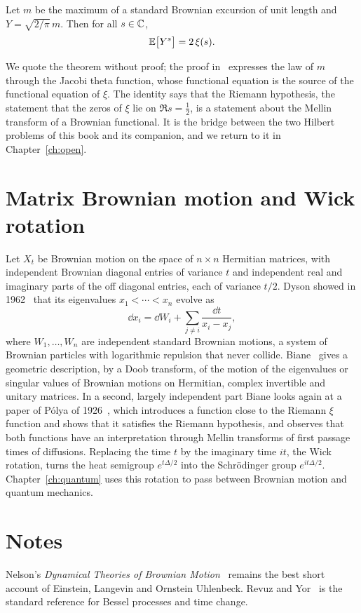 \begin{theorem}
\label{thm:bpy}
Let $m$ be the maximum of a standard Brownian excursion of unit length and $Y = \sqrt{2/\pi}\,m$. Then for all $s\in\mathbb{C}$,
\[
\mathbb{E}\big[Y^s\big] = 2\,\xi(s).
\]
\end{theorem}

We quote the theorem without proof; the proof in~\cite{bpy2001} expresses the law of $m$ through the Jacobi theta function, whose functional equation is the source of the functional equation of $\xi$. The identity says that the Riemann hypothesis, the statement that the zeros of $\xi$ lie on $\Re s = \frac12$, is a statement about the Mellin transform of a Brownian functional. It is the bridge between the two Hilbert problems of this book and its companion, and we return to it in Chapter~\ref{ch:open}.

\section{Matrix Brownian motion and Wick rotation}

Let $X_t$ be Brownian motion on the space of $n\times n$ Hermitian matrices, with independent Brownian diagonal entries of variance $t$ and independent real and imaginary parts of the off diagonal entries, each of variance $t/2$. Dyson showed in 1962~\cite{dyson1962} that its eigenvalues $x_1<\cdots<x_n$ evolve as
\[
\dd x_i = \dd W_i + \sum_{j\neq i}\frac{\dd t}{x_i-x_j},
\]
where $W_1,\dots,W_n$ are independent standard Brownian motions, a system of Brownian particles with logarithmic repulsion that never collide. Biane~\cite{biane2009} gives a geometric description, by a Doob transform, of the motion of the eigenvalues or singular values of Brownian motions on Hermitian, complex invertible and unitary matrices. In a second, largely independent part Biane looks again at a paper of P\'olya of 1926~\cite{polya1926}, which introduces a function close to the Riemann $\xi$ function and shows that it satisfies the Riemann hypothesis, and observes that both functions have an interpretation through Mellin transforms of first passage times of diffusions. Replacing the time $t$ by the imaginary time $it$, the Wick rotation, turns the heat semigroup $e^{t\Delta/2}$ into the Schr\"odinger group $e^{it\Delta/2}$. Chapter~\ref{ch:quantum} uses this rotation to pass between Brownian motion and quantum mechanics.



\section*{Notes}

Nelson's \emph{Dynamical Theories of Brownian Motion}~\cite{nelson1967} remains the best short account of Einstein, Langevin and Ornstein Uhlenbeck. Revuz and Yor~\cite{revuzyor} is the standard reference for Bessel processes and time change.
